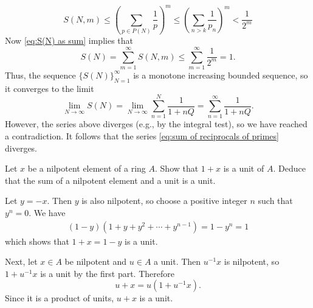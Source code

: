 \documentclass{homework}
\begin{document}
\begin{solution}
\begin{equation*}
S(N, m)
\leq \left(\sum_{p \in P(N)} \frac{1}{p}\right)^{m}
\leq \left(\sum_{n > k} \frac{1}{p_n}\right)^{m}
< \frac{1}{2^m}
\end{equation*}
Now \eqref{eq:S(N) as sum} implies that
\begin{equation*}
S(N)
= \sum_{m=1}^\infty S(N, m)
\leq \sum_{m=1}^\infty \frac{1}{2^m} = 1.
\end{equation*}
Thus, the sequence $\{S(N)\}_{N=1}^\infty$ is a monotone increasing bounded
sequence, so it converges to the limit
\begin{equation*}
\lim_{N \to \infty} S(N)
= \lim_{N \to \infty} \sum_{n=1}^N \frac{1}{1 + n Q}
= \sum_{n=1}^\infty \frac{1}{1 + n Q}.
\end{equation*}
However, the series above diverges (e.g., by the integral test), so we have
reached a contradiction.
It follows that the series \eqref{eq:sum of reciprocals of primes} diverges.
\end{solution}

\begin{problem}
Let $x$ be a nilpotent element of a ring $A$.
Show that $1 + x$ is a unit of $A$.
Deduce that the sum of a nilpotent element and a unit is a unit.
\end{problem}

\begin{solution}
Let $y = -x$.
Then $y$ is also nilpotent, so choose a positive integer $n$ such that
$y^n = 0$.
We have
\begin{align*}
(1 - y) (1 + y + y^2 + \cdots + y^{n-1})
= 1 - y^n
= 1
\end{align*}
which shows that $1 + x = 1 - y$ is a unit.

Next, let $x\in A$ be nilpotent and $u\in A$ a unit.
Then $u^{-1} x$ is nilpotent, so $1 + u^{-1}x$ is a unit by the first part.
Therefore
\begin{equation*}
u + x = u(1 + u^{-1} x).
\end{equation*}
Since it is a product of units, $u + x$ is a unit.
\end{solution}
\end{document}
